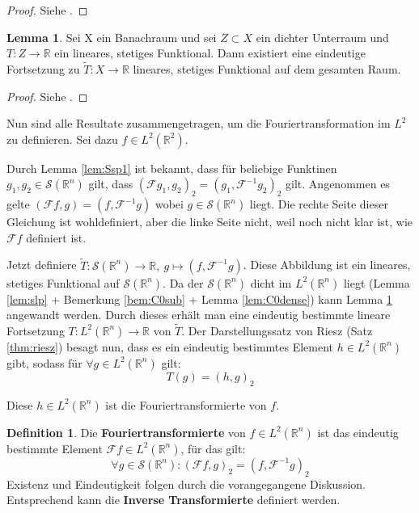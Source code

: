 \documentclass{article}
\newcommand{\R}[0]{\mathbb{R}}
\newcommand{\F}[0]{\mathcal{F}}
\newcommand{\Ssp}[0]{\mathcal{S}}
\theoremstyle{plain}
\theoremstyle{definition}
\newtheorem{defin}[thm]{Definition}
\newtheorem{lemma}[thm]{Lemma}
\begin{document}
\begin{proof}
    Siehe \cite[S. 171, Satz 4.1]{alt2016linear}.
\end{proof}

\begin{lemma}\label{lem:Text}
    Sei X ein Banachraum und sei $Z \subset X$ ein dichter Unterraum und $T: Z \to \R$ ein lineares, stetiges Funktional. Dann existiert eine eindeutige Fortsetzung zu $\tilde{T}: X \to \R$ lineares, stetiges Funktional auf dem gesamten Raum.
\end{lemma}

\begin{proof}
    Siehe \cite[S. 168, U 3.3]{alt2016linear}.
\end{proof}

Nun sind alle Resultate zusammengetragen, um die Fouriertransformation im $L^2$ zu definieren. Sei dazu $f \in L^2(\R^2)$.

Durch Lemma \ref{lem:Ssp1} ist bekannt, dass für beliebige Funktinen $g_1, g_2 \in \Ssp(\R^n)$ gilt, dass $(\F g_1, g_2)_2 = (g_1, \F^{-1}g_2)_2$ gilt.
Angenommen es gelte $(\F f, g) = (f, \F^{-1}g)$ wobei $g \in \Ssp(\R^n)$ liegt. Die rechte Seite dieser Gleichung ist wohldefiniert, aber die linke Seite nicht, weil noch nicht klar ist, wie $\F f$ definiert ist.

Jetzt definiere $\tilde{T}: \Ssp(\R^n) \to \R, \: g \mapsto (f, \F^{-1}g)$. Diese Abbildung ist ein lineares, stetiges Funktional auf $\Ssp(\R^n)$. 
Da der $\Ssp(\R^n)$ dicht im $L^2(\R^n)$ liegt (Lemma \ref{lem:slp} + Bemerkung \ref{bem:C0sub} + Lemma \ref{lem:C0dense}) kann Lemma \ref{lem:Text} angewandt werden.
Durch dieses erhält man eine eindeutig bestimmte lineare Fortsetzung $T: L^2(\R^n) \to \R$ von $\tilde{T}$. 
Der Darstellungssatz von Riesz (Satz \ref{thm:riesz}) besagt nun, dass es ein eindeutig bestimmtes Element $h \in L^2(\R^n)$ gibt, sodass für $\forall g \in L^2(\R^n)$ gilt:
\begin{equation}
    T(g) = (h, g)_2
\end{equation}

Diese $h \in L^2(\R^n)$ ist die Fouriertransformierte von $f$. \cite[S. 428f.]{ebert2018methods}

\begin{defin}
    Die \textbf{Fouriertransformierte} von $f \in L^2(\R^n)$ ist das eindeutig bestimmte Element $\F f \in L^2(\R^n)$, für das gilt:
    \begin{equation}
        \forall g \in \Ssp(\R^n): (\F f, g)_2 = (f, \F^{-1}g)_2
    \end{equation}
    Existenz und Eindeutigkeit folgen durch die vorangegangene Diskussion.
    Entsprechend kann die \textbf{Inverse Transformierte} definiert werden.
\end{defin}
\end{document}
